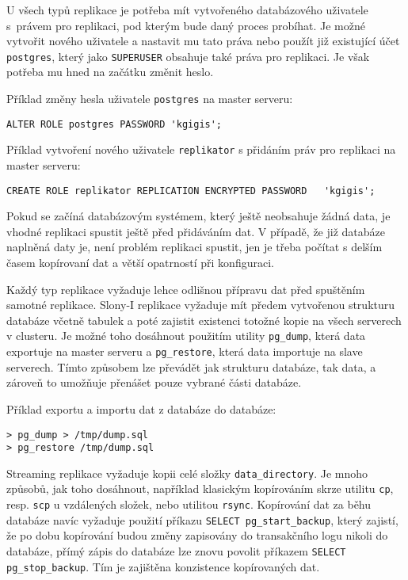      U všech typů replikace je potřeba mít vytvořeného databázového uživatele s~právem pro replikaci, pod kterým bude daný proces probíhat. Je možné vytvořit nového uživatele a nastavit mu tato práva nebo použít již existující účet \texttt{postgres}, který jako \texttt{SUPERUSER} obsahuje také práva pro replikaci. Je však potřeba mu hned na začátku změnit heslo.

Příklad změny hesla uživatele \texttt{postgres} na master serveru:
\begin{lstlisting}
ALTER ROLE postgres PASSWORD 'kgigis';
\end{lstlisting}

Příklad vytvoření nového uživatele \texttt{replikator} s přidáním práv pro replikaci na master serveru: 
\begin{lstlisting}[]
CREATE ROLE replikator REPLICATION ENCRYPTED PASSWORD   'kgigis';
\end{lstlisting}

Pokud se začíná databázovým systémem, který ještě neobsahuje žádná data, je vhodné replikaci spustit ještě před přidáváním dat. V případě, že již databáze naplněná daty je, není problém replikaci spustit, jen je třeba počítat s delším časem kopírovaní dat a větší opatrností při konfiguraci. 

Každý typ replikace vyžaduje lehce odlišnou přípravu dat před spuštěním samotné replikace. 
Slony-I replikace vyžaduje mít předem vytvořenou strukturu databáze včetně tabulek a poté zajistit existenci totožné kopie na všech serverech v clusteru. Je možné toho dosáhnout použitím utility \texttt{pg\_dump}, která data exportuje na master serveru a \texttt{pg\_restore}, která data importuje na slave serverech. Tímto způsobem lze převádět jak strukturu databáze, tak data, a zároveň to umožňuje přenášet pouze vybrané části databáze. 

Příklad exportu a importu dat z databáze do databáze:
\begin{lstlisting}[keywordstyle=\color{purpurova7},identifierstyle=\color{black},stringstyle=\color{black}]
> pg_dump > /tmp/dump.sql
> pg_restore /tmp/dump.sql
\end{lstlisting}

Streaming replikace vyžaduje kopii celé složky \texttt{data\_directory}. Je mnoho způsobů, jak toho dosáhnout, například klasickým kopírováním skrze utilitu \texttt{cp}, resp. \texttt{scp} u vzdálených složek, nebo utilitou \texttt{rsync}. Kopírování dat za běhu databáze navíc vyžaduje použití příkazu \texttt{SELECT pg\_start\_backup}, který zajistí, že po dobu kopírování budou změny zapisovány do transakčního logu nikoli do databáze, přímý zápis do databáze lze znovu povolit příkazem \texttt{SELECT pg\_stop\_backup}. Tím je zajištěna konzistence kopírovaných dat. 

